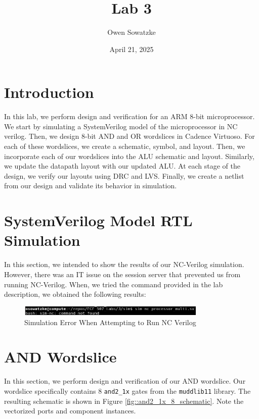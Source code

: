 \documentclass{article}
\title{Lab 3}
\author{Owen Sowatzke}
\date{April 21, 2025}
\newcommand{\zerodisplayskip}{
	\setlength{\abovedisplayskip}{0pt}%
	\setlength{\belowdisplayskip}{0pt}%
	\setlength{\abovedisplayshortskip}{0pt}%
	\setlength{\belowdisplayshortskip}{0pt}%
	\setlength{\mathindent}{0pt}}
\begin{document}
	\maketitle
	
	\section{Introduction}
	
	In this lab, we perform design and verification for an ARM 8-bit microprocessor. We start by simulating a SystemVerilog model of the microprocessor in NC verilog. Then, we design 8-bit AND and OR wordslices in Cadence Virtuoso. For each of these wordslices, we create a schematic, symbol, and layout. Then, we incorporate each of our wordslices into the ALU schematic and layout. Similarly, we update the datapath layout with our updated ALU. At each stage of the design, we verify our layouts using DRC and LVS. Finally, we create a netlist from our design and validate its behavior in simulation. 
	
	\section{SystemVerilog Model RTL Simulation}
	
	In this section, we intended to show the results of our NC-Verilog  simulation. However, there was an IT issue on the session server that prevented us from running NC-Verilog. When, we tried the command provided in the lab description, we obtained the following results:
	
	\begin{figure}[H]
		\centerline{\includegraphics[width=0.8\textwidth]{sim_error.png}}
		\caption{Simulation Error When Attempting to Run NC Verilog}
		\label{fig::sim_error}
	\end{figure}
	 
	\section{AND Wordslice}
	\label{section::and_wordslice}
	
	In this section, we perform design and verification of our AND wordslice. Our wordslice specifically contains 8 \texttt{and2\_1x} gates from the \texttt{muddlib11} library. The resulting schematic is shown in Figure \ref{fig::and2_1x_8_schematic}. Note the vectorized ports and component instances.
	
\end{document}
